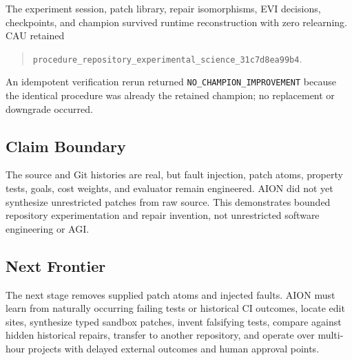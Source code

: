 The experiment session, patch library, repair isomorphisms, EVI decisions,
checkpoints, and champion survived runtime reconstruction with zero relearning.
CAU retained
\begin{quote}
\texttt{procedure\_repository\_experimental\_science\_31c7d8ea99b4}.
\end{quote}
An idempotent verification rerun returned
\texttt{NO\_CHAMPION\_IMPROVEMENT} because the identical procedure was already
the retained champion; no replacement or downgrade occurred.

\subsection{Claim Boundary}

The source and Git histories are real, but fault injection, patch atoms,
property tests, goals, cost weights, and evaluator remain engineered. AION did
not yet synthesize unrestricted patches from raw source. This demonstrates
bounded repository experimentation and repair invention, not unrestricted
software engineering or AGI.

\subsection{Next Frontier}

The next stage removes supplied patch atoms and injected faults. AION must learn
from naturally occurring failing tests or historical CI outcomes, locate edit
sites, synthesize typed sandbox patches, invent falsifying tests, compare
against hidden historical repairs, transfer to another repository, and operate
over multi-hour projects with delayed external outcomes and human approval
points.
